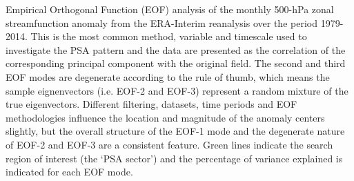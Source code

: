 \label{fig:eof}
Empirical Orthogonal Function (EOF) analysis of the monthly 500-hPa zonal streamfunction anomaly from the ERA-Interim reanalysis over the period 1979-2014. This is the most common method, variable and timescale used to investigate the PSA pattern and the data are presented as the correlation of the corresponding principal component with the original field.  The second and third EOF modes are degenerate according to the \citet{North1982} rule of thumb, which means the sample eignenvectors (i.e. EOF-2 and EOF-3) represent a random mixture of the true eigenvectors. Different filtering, datasets, time periods and EOF methodologies influence the location and magnitude of the anomaly centers slightly, but the overall structure of the EOF-1 mode and the degenerate nature of EOF-2 and EOF-3 are a consistent feature. Green lines indicate the search region of interest (the `PSA sector') and the percentage of variance explained is indicated for each EOF mode.